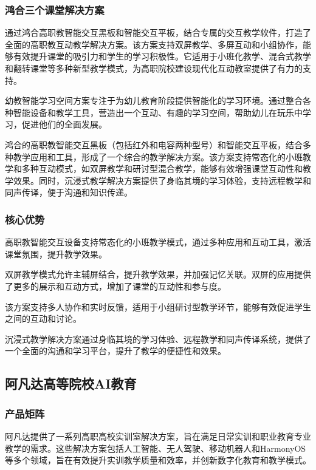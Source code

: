 \subsubsection{鸿合三个课堂解决方案}
通过鸿合高职教智能交互黑板和智能交互平板，结合专属的交互教学软件，打造了全面的高职教互动教学解决方案。该方案支持双屏教学、多屏互动和小组协作，能够有效提升课堂的吸引力和学生的学习积极性。它适用于小班化教学、混合式教学和翻转课堂等多种新型教学模式，为高职院校建设现代化互动教室提供了有力的支持。

幼教智能学习空间方案专注于为幼儿教育阶段提供智能化的学习环境。通过整合各种智能设备和教学工具，营造出一个互动、有趣的学习空间，帮助幼儿在玩乐中学习，促进他们的全面发展。

鸿合的高职教智能交互黑板（包括红外和电容两种型号）和智能交互平板，结合多种教学应用和工具，形成了一个综合的教学解决方案。该方案支持常态化的小班教学和多种互动模式，如双屏教学和研讨型混合教学，能够有效增强课堂互动性和教学效果。同时，沉浸式教学解决方案提供了身临其境的学习体验，支持远程教学和同声传译，便于沟通和知识传递。

\subsubsection{核心优势}
高职教智能交互设备支持常态化的小班教学模式，通过多种应用和互动工具，激活课堂氛围，提升教学效果。

双屏教学模式允许主辅屏结合，提升教学效果，并加强记忆关联。双屏的应用提供了更多的展示和互动方式，增加了课堂的互动性和参与度。

该方案支持多人协作和实时反馈，适用于小组研讨型教学环节，能够有效促进学生之间的互动和讨论。

沉浸式教学解决方案通过身临其境的学习体验、远程教学和同声传译系统，提供了一个全面的沟通和学习平台，提升了教学的便捷性和效果。


\subsection{阿凡达高等院校AI教育}

\subsubsection{产品矩阵}
阿凡达提供了一系列高职高校实训室解决方案，旨在满足日常实训和职业教育专业教学的需求。这些解决方案包括人工智能、无人驾驶、移动机器人和HarmonyOS等多个领域，旨在有效提升实训教学质量和效率，并创新数字化教育和教学模式。

